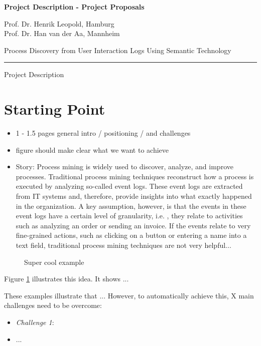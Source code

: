 \documentclass{scrartcl}
\newcommand{\applicants}{Prof. Dr. Henrik Leopold, Hamburg \\ Prof. Dr. Han van der Aa, Mannheim}
\newcommand{\project}{Process Discovery from User Interaction Logs Using Semantic Technology}
\begin{document}

{\raggedright{} \normalsize \bfseries 
	Project Description - Project Proposals \par
	\applicants{} \par
	\project{} \par
	\rule{\textwidth}{0.5pt} \par
	Project Description
}

\newenvironment{nscenter}
 {\parskip=3pt\par\nopagebreak\centering}
 {\par\noindent\ignorespacesafterend}

\section{Starting Point}

\begin{itemize}
\item 1 - 1.5 pages general intro / positioning / and challenges
\item figure should make clear what we want to achieve
\item Story: Process mining is widely used to discover, analyze, and improve processes. Traditional process mining techniques reconstruct how a process is executed by analyzing so-called event logs. These event logs are extracted from IT systems and, therefore, provide insights into what exactly happened in the organization. A key assumption, however, is that the events in these event logs have a certain level of granularity, i.e. , they relate to activities such as analyzing an order or sending an invoice. If the events relate to very fine-grained actions, such as clicking on a button or entering a name into a text field, traditional process mining techniques are not very helpful... 
\end{itemize}


\begin{figure}[h!]
\centering
\caption{Super cool example}
\label{fig:example}
\end{figure}

Figure \ref{fig:example} illustrates this idea. It shows ... 

These examples illustrate that ...  However, to automatically achieve this, X main challenges need to be overcome: 

\begin{itemize}
\item \textit{Challenge 1}: 
\item ...
\end{itemize}
\end{document}
